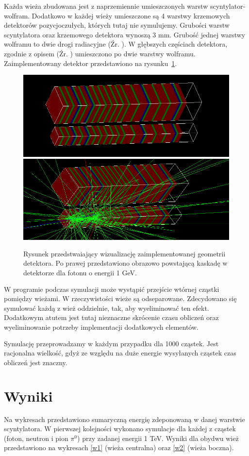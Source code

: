 \documentclass[11pt]{article}
\begin{document}
Każda wieża zbudowana jest z naprzemiennie umieszczonych warstw scyntylator-wolfram. 
Dodatkowo w każdej wieży umieszczone są 4 warstwy krzemowych
detektorów pozycjoczułych, których tutaj nie symulujemy. Grubości warstw scyntylatora oraz krzemowego detektora wynoszą 3 mm. Grubość
jednej warstwy wolframu to dwie drogi radiacyjne (Źr. \cite{2}). 
W głębszych częściach detektora, zgodnie z opisem (Źr. \cite{1}) umieszczono po dwie warstwy wolframu.
Zaimplementowany detektor przedstawiono na rysunku~\ref{rys2}.


\begin{figure}
\begin{center}
\includegraphics[width=0.45\linewidth]{moj_det.png}
\includegraphics[width=0.45\linewidth]{lhcc3.png}
\caption{Rysunek przedstwaiający wizualizację zaimplementowanej geometrii detektora. Po prawej przedstawiono obrazowo powstającą 
kaskadę w detektorze dla fotonu o energii 1 GeV.}{\label{rys2}}
\end{center}
\end{figure}


W programie podczas symulacji może wystąpić przejście wtórnej cząstki pomiędzy wieżami. W rzeczywistości wieże są odseparowane. 
Zdecydowano się symulować każdą z wież oddzielnie, tak, aby wyeliminować ten efekt. Dodatkowym atutem jest tutaj nieznaczne skrócenie
czasu obliczeń oraz wyeliminowanie potrzeby implementacji dodatkowych elementów.

Symulację przeprowadzamy w każdym przypadku dla 1000 cząstek. Jest racjonalna wielkość, gdyż ze względu na duże energie wysyłanych
cząstek czas obliczeń jest znaczny.

\section*{Wyniki}

 Na wykresach przedstawiono sumaryczną energię zdeponowaną w danej warstwie scyntylatora.
W pierwszej kolejności wykonano symulacje dla każdej z cząstek (foton, neutron i pion $\pi^0$) przy zadanej energii 1 TeV. Wyniki dla obydwu wież 
przedstawiono na wykresach \ref{w1} (wieża centralna) oraz \ref{w2} (wieża boczna). 
\end{document}
